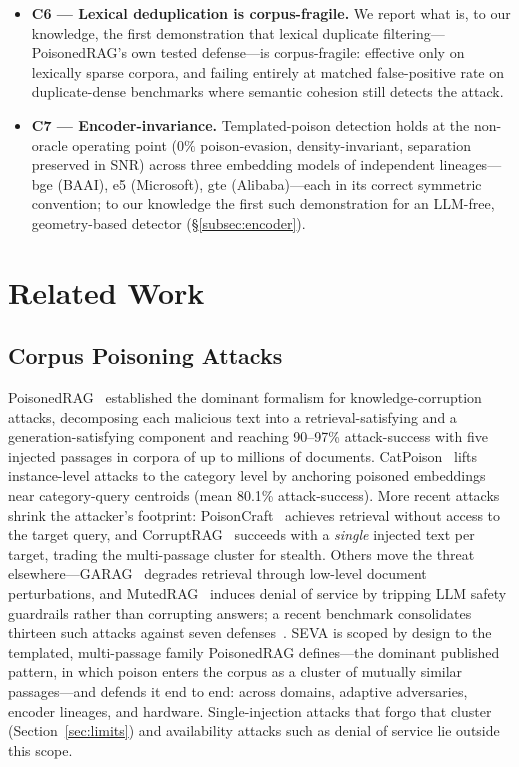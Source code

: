 \documentclass[conference]{IEEEtran}
\begin{document}
\begin{itemize}
\item \textbf{C6 --- Lexical deduplication is corpus-fragile.} We report what is, to our
knowledge, the first demonstration that lexical duplicate filtering---PoisonedRAG's own tested
defense---is corpus-fragile: effective only on lexically sparse corpora, and failing entirely at
matched false-positive rate on duplicate-dense benchmarks where semantic cohesion still detects
the attack.

\item \textbf{C7 --- Encoder-invariance.} Templated-poison detection holds at the non-oracle
operating point ($0\%$ poison-evasion, density-invariant, separation preserved in SNR) across
three embedding models of independent lineages---bge (BAAI), e5 (Microsoft), gte (Alibaba)---each
in its correct symmetric convention; to our knowledge the first such demonstration for an
LLM-free, geometry-based detector (\S\ref{subsec:encoder}).
\end{itemize}

\section{Related Work}
\label{sec:related}

\subsection{Corpus Poisoning Attacks}
PoisonedRAG~\cite{poisonedrag} established the dominant formalism for
knowledge-corruption attacks, decomposing each malicious text into a
retrieval-satisfying and a generation-satisfying component and reaching 90--97\%
attack-success with five injected passages in corpora of up to millions of
documents. CatPoison~\cite{catpoison} lifts instance-level attacks to the
category level by anchoring poisoned embeddings near category-query centroids
(mean 80.1\% attack-success). More recent attacks shrink the
attacker's footprint: PoisonCraft~\cite{poisoncraft} achieves retrieval without
access to the target query, and CorruptRAG~\cite{corruptrag} succeeds with a
\emph{single} injected text per target, trading the multi-passage cluster for
stealth. Others move the threat elsewhere---GARAG~\cite{garag} degrades retrieval
through low-level document perturbations, and MutedRAG~\cite{mutedrag} induces
denial of service by tripping LLM safety guardrails rather than corrupting
answers; a recent benchmark consolidates thirteen such attacks against seven
defenses~\cite{ragpoisonbench}. SEVA is scoped by design to the templated,
multi-passage family PoisonedRAG defines---the dominant published pattern, in which
poison enters the corpus as a cluster of mutually similar passages---and defends it
end to end: across domains, adaptive adversaries, encoder lineages, and hardware.
Single-injection attacks that forgo that cluster (Section~\ref{sec:limits}) and
availability attacks such as denial of service lie outside this scope.
\end{document}
